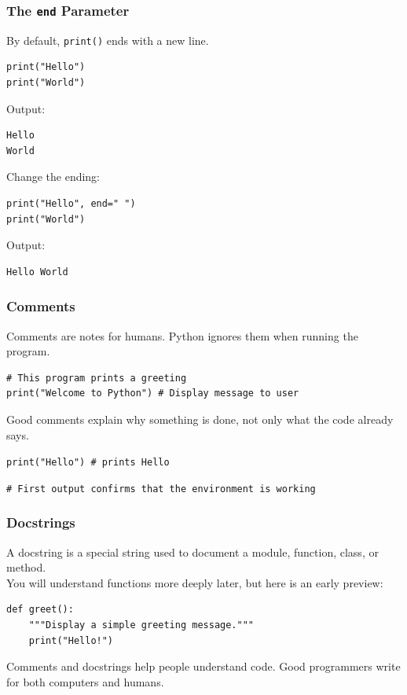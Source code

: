 \documentclass[aspectratio=169,10pt]{beamer}
\begin{document}
\begin{frame}[fragile]
\frametitle{The \texttt{end} Parameter}
\vspace{0.22cm}
By default, \texttt{print()} ends with a new line.
\begin{lstlisting}[style=pycodelarge,aboveskip=2pt,belowskip=4pt]
print("Hello")
print("World")
\end{lstlisting}
Output:
\begin{lstlisting}[style=outcode,aboveskip=2pt,belowskip=5pt]
Hello
World
\end{lstlisting}
Change the ending:
\begin{lstlisting}[style=pycodelarge,aboveskip=2pt,belowskip=4pt]
print("Hello", end=" ")
print("World")
\end{lstlisting}
Output:
\begin{lstlisting}[style=outcode,aboveskip=2pt,belowskip=2pt]
Hello World
\end{lstlisting}
\end{frame}


\begin{frame}[fragile]
\frametitle{Comments}
\vspace{0.44cm}
Comments are notes for humans. Python ignores them when running the program.
\begin{lstlisting}[style=pycodelarge,aboveskip=3pt,belowskip=7pt]
# This program prints a greeting
print("Welcome to Python") # Display message to user
\end{lstlisting}
Good comments explain why something is done, not only what the code already says.
\vspace{0.12cm}
\begin{tcolorbox}[lecturebox,title=Weak comment,top=0.5mm,bottom=0.5mm]
\texttt{print("Hello") \# prints Hello}
\end{tcolorbox}
\vspace{0.1cm}
\begin{tcolorbox}[lecturebox,title=Better comment,top=0.5mm,bottom=0.5mm]
\texttt{\# First output confirms that the environment is working}
\end{tcolorbox}
\end{frame}


\begin{frame}[fragile]
\frametitle{Docstrings}
\vspace{0.58cm}
A docstring is a special string used to document a module, function, class, or method.\\
You will understand functions more deeply later, but here is an early preview:
\begin{lstlisting}[style=pycodelarge,aboveskip=5pt,belowskip=12pt]
def greet():
    """Display a simple greeting message."""
    print("Hello!")
\end{lstlisting}
\begin{tcolorbox}[lecturebox,title=Beginner takeaway]
Comments and docstrings help people understand code. Good programmers write for both computers and humans.
\end{tcolorbox}
\end{frame}
\end{document}
